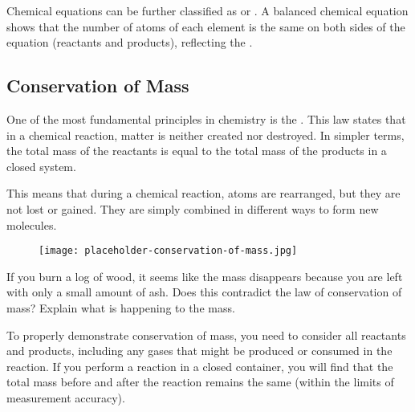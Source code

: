 Chemical equations can be further classified as  or . A balanced chemical equation shows that the number of atoms of each element is the same on both sides of the equation (reactants and products), reflecting the .

\subsection{Conservation of Mass}

One of the most fundamental principles in chemistry is the . This law states that in a chemical reaction, matter is neither created nor destroyed.  In simpler terms, the total mass of the reactants is equal to the total mass of the products in a closed system.

\begin{marginnote}
\end{marginnote}

This means that during a chemical reaction, atoms are rearranged, but they are not lost or gained. They are simply combined in different ways to form new molecules.

\begin{figure}
\centering
\texttt{[image: placeholder-conservation-of-mass.jpg]}
\end{figure}

\begin{stopandthink}
If you burn a log of wood, it seems like the mass disappears because you are left with only a small amount of ash. Does this contradict the law of conservation of mass? Explain what is happening to the mass.
\end{stopandthink}

To properly demonstrate conservation of mass, you need to consider all reactants and products, including any gases that might be produced or consumed in the reaction.  If you perform a reaction in a closed container, you will find that the total mass before and after the reaction remains the same (within the limits of measurement accuracy).

